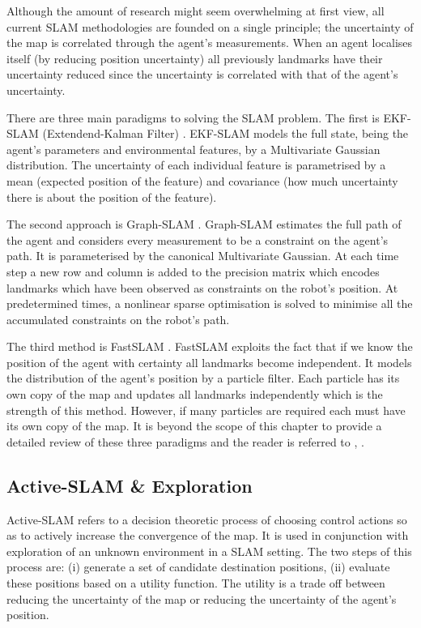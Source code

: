 
Although the amount of research might seem overwhelming at first view, all current SLAM methodologies are founded on a single principle; 
the uncertainty of the map is correlated through the agent's measurements. When an agent localises itself (by reducing position uncertainty)
all previously landmarks have their uncertainty reduced since the uncertainty is correlated with that of the agent's uncertainty.


There are three main paradigms to solving the SLAM problem. The first is EKF-SLAM (Extendend-Kalman Filter) \cite{SLAM_part1}.
EKF-SLAM models the full state, being the agent's parameters and environmental features, by a Multivariate Gaussian distribution. 
The uncertainty of each individual feature is parametrised by a mean (expected position of the feature) and covariance 
(how much uncertainty there is about the position of the feature).

The second approach is Graph-SLAM \cite{TutGraphSLAM}. Graph-SLAM estimates the full path of the agent and considers every measurement to 
be a constraint on the agent's path. It is parameterised by the canonical Multivariate Gaussian. At each time step a new row and column 
is added to the precision matrix which encodes landmarks which have been observed as constraints on the robot's position.
At predetermined times, a nonlinear sparse optimisation is solved to minimise all the accumulated constraints on the robot's path.

The third method is FastSLAM \cite{FastSLAM}. FastSLAM exploits the fact that if we know the position of the agent with 
certainty all landmarks become independent. It models the distribution of the agent's position by a particle filter. Each particle
has its own copy of the map and updates all landmarks independently which is the strength of this method. 
However, if many particles are required each must have its own copy of the map. 
It is beyond the scope of this chapter to provide a detailed review of these  three paradigms and the reader is referred to \cite{Thrun_Burgard_Fox_2005}, \cite{SLAM_HBR}.

\subsection{Active-SLAM \& Exploration}

Active-SLAM refers to a decision theoretic process of choosing control actions so as to actively 
increase the convergence of the map. It is used in conjunction with exploration of an unknown environment
in a SLAM setting. The two steps of this process are: (i) generate a set of 
candidate destination positions, (ii) evaluate these positions based on a utility function. The utility  
is a trade off between reducing the uncertainty of the map or reducing the uncertainty
of the agent's position.

